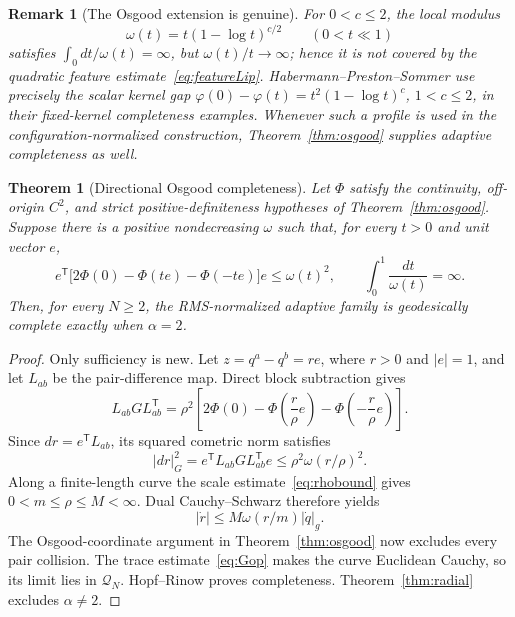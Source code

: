 \documentclass[11pt]{article}
\newtheorem{theorem}{Theorem}
\newtheorem{remark}{Remark}
\newcommand{\Q}{\mathcal{Q}}
\begin{document}
\begin{remark}[The Osgood extension is genuine]
For \(0<c\le2\), the local modulus
\[
 \omega(t)=t(1-\log t)^{c/2}\qquad(0<t\ll1)
\]
satisfies \(\int_0dt/\omega(t)=\infty\), but
\(\omega(t)/t\to\infty\); hence it is not covered by the quadratic
feature estimate~\eqref{eq:featureLip}.  Habermann--Preston--Sommer
\cite{HPS} use precisely the scalar kernel gap
\(\varphi(0)-\varphi(t)=t^2(1-\log t)^c\), \(1<c\le2\), in their
fixed-kernel completeness examples.  Whenever such a profile is used in the
configuration-normalized construction, Theorem~\ref{thm:osgood} supplies
adaptive completeness as well.
\end{remark}

\begin{theorem}[Directional Osgood completeness]
\label{thm:directionalosgood}
Let \(\Phi\) satisfy the continuity, off-origin \(C^2\), and strict
positive-definiteness hypotheses of Theorem~\ref{thm:osgood}.  Suppose there
is a positive nondecreasing \(\omega\) such that, for every \(t>0\) and unit
vector \(e\),
\begin{equation}
 e^{\mathsf T}
 \bigl[2\Phi(0)-\Phi(te)-\Phi(-te)\bigr]e
 \le\omega(t)^2,
 \qquad
 \int_0^1\frac{dt}{\omega(t)}=\infty.
 \label{eq:directionalosgood}
\end{equation}
Then, for every \(N\ge2\), the RMS-normalized adaptive family is
geodesically complete exactly when \(\alpha=2\).
\end{theorem}

\begin{proof}
Only sufficiency is new.  Let
\(z=q^a-q^b=r e\), where \(r>0\) and \(|e|=1\), and let \(L_{ab}\)
be the pair-difference map.  Direct block subtraction gives
\[
 L_{ab}GL_{ab}^{\mathsf T}
 =\rho^2
 \left[
 2\Phi(0)-\Phi\left(\frac r\rho e\right)
             -\Phi\left(-\frac r\rho e\right)
 \right].
\]
Since \(dr=e^{\mathsf T}L_{ab}\), its squared cometric norm satisfies
\[
 |dr|_G^2
 =e^{\mathsf T}L_{ab}GL_{ab}^{\mathsf T}e
 \le\rho^2\omega(r/\rho)^2.
\]
Along a finite-length curve the scale estimate~\eqref{eq:rhobound} gives
\(0<m\le\rho\le M<\infty\).  Dual Cauchy--Schwarz therefore yields
\[
 |\dot r|
 \le M\omega(r/m)|\dot q|_g.
\]
The Osgood-coordinate argument in Theorem~\ref{thm:osgood} now excludes
every pair collision.  The trace estimate~\eqref{eq:Gop} makes the curve
Euclidean Cauchy, so its limit lies in \(\Q_N\).  Hopf--Rinow proves
completeness.  Theorem~\ref{thm:radial} excludes \(\alpha\ne2\).
\end{proof}
\end{document}
